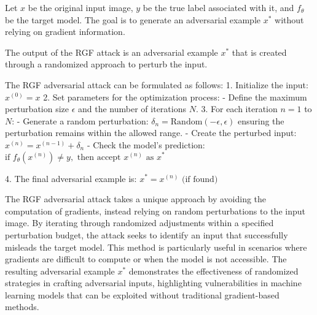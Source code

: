 Let $x$ be the original input image, $y$ be the true label associated with it, and $f_{\theta}$ be the target model. The goal is to generate an adversarial example $x^*$ without relying on gradient information.

The output of the RGF attack is an adversarial example $x^*$ that is created through a randomized approach to perturb the input.

The RGF adversarial attack can be formulated as follows:
1. Initialize the input:
$x^{(0)} = x$
2. Set parameters for the optimization process:
   - Define the maximum perturbation size $\epsilon$ and the number of iterations $N$.
3. For each iteration $n = 1$ to $N$:
   - Generate a random perturbation:
   $\delta_n = \text{Random}(-\epsilon, \epsilon)$
   ensuring the perturbation remains within the allowed range.
   - Create the perturbed input:
   $x^{(n)} = x^{(n-1)} + \delta_n$
   - Check the model's prediction:
   $\text{if } f_{\theta}(x^{(n)}) \neq y, \text{ then accept } x^{(n)} \text{ as } x^*$

4. The final adversarial example is:
   $x^* = x^{(n)} \text{ (if found)}$

The RGF adversarial attack takes a unique approach by avoiding the computation of gradients, instead relying on random perturbations to the input image. By iterating through randomized adjustments within a specified perturbation budget, the attack seeks to identify an input that successfully misleads the target model. This method is particularly useful in scenarios where gradients are difficult to compute or when the model is not accessible. The resulting adversarial example $x^*$ demonstrates the effectiveness of randomized strategies in crafting adversarial inputs, highlighting vulnerabilities in machine learning models that can be exploited without traditional gradient-based methods.
